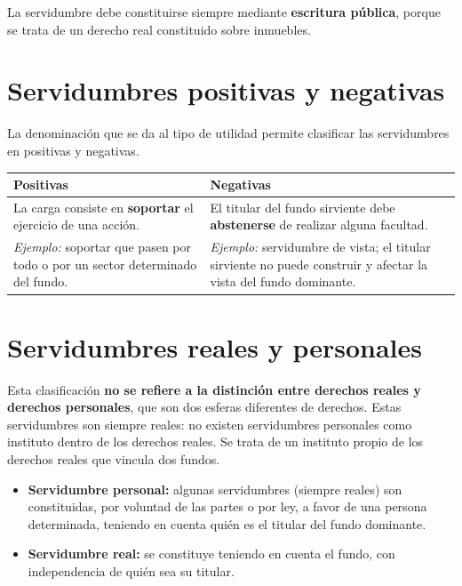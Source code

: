 \documentclass[12pt,oneside]{book}
\begin{document}
La servidumbre debe constituirse siempre mediante \textbf{escritura pública}, porque se trata de un derecho real constituido sobre inmuebles.

\section{Servidumbres positivas y negativas}

La denominación que se da al tipo de utilidad permite clasificar las servidumbres en positivas y negativas.

\begin{table}[H]
\centering
\renewcommand{\arraystretch}{1.3}
\begin{tabularx}{\textwidth}{
    >{\raggedright\arraybackslash}X
    >{\raggedright\arraybackslash}X
}
\toprule
\textbf{Positivas} & \textbf{Negativas} \\
\midrule
La carga consiste en \textbf{soportar} el ejercicio de una acción.
&
El titular del fundo sirviente debe \textbf{abstenerse} de realizar alguna facultad. \\[0.5em]
\emph{Ejemplo:} soportar que pasen por todo o por un sector determinado del fundo.
&
\emph{Ejemplo:} servidumbre de vista; el titular sirviente no puede construir y afectar la vista del fundo dominante. \\
\bottomrule
\end{tabularx}
\end{table}

\section{Servidumbres reales y personales}

Esta clasificación \textbf{no se refiere a la distinción entre derechos reales y derechos personales}, que son dos esferas diferentes de derechos. Estas servidumbres son siempre reales: no existen servidumbres personales como instituto dentro de los derechos reales. Se trata de un instituto propio de los derechos reales que vincula dos fundos.

\begin{itemize}
    \item \textbf{Servidumbre personal:} algunas servidumbres (siempre reales) son constituidas, por voluntad de las partes o por ley, a favor de una persona determinada, teniendo en cuenta quién es el titular del fundo dominante.
    \item \textbf{Servidumbre real:} se constituye teniendo en cuenta el fundo, con independencia de quién sea su titular.
\end{itemize}
\end{document}
